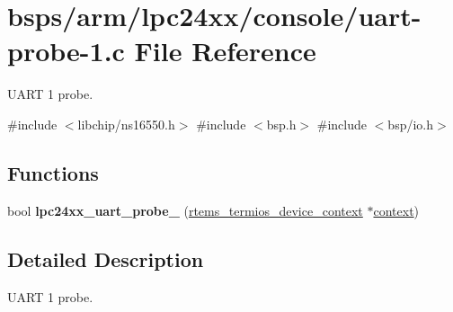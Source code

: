 \hypertarget{uart-probe-1_8c}{}\section{bsps/arm/lpc24xx/console/uart-\/probe-\/1.c File Reference}
\label{uart-probe-1_8c}


U\+A\+RT 1 probe.  


{\ttfamily \#include $<$libchip/ns16550.\+h$>$}\newline
{\ttfamily \#include $<$bsp.\+h$>$}\newline
{\ttfamily \#include $<$bsp/io.\+h$>$}\newline
\subsection*{Functions}
\begin{DoxyCompactItemize}
\item 
bool {\bfseries lpc24xx\+\_\+uart\+\_\+probe\+\_} (\mbox{\hyperlink{structrtems__termios__device__context}{rtems\+\_\+termios\+\_\+device\+\_\+context}} $\ast$\mbox{\hyperlink{sun4u_2tte_8h_a9b4a99475e2709333b8e5d70483173f1}{context}})
\end{DoxyCompactItemize}


\subsection{Detailed Description}
U\+A\+RT 1 probe. 

